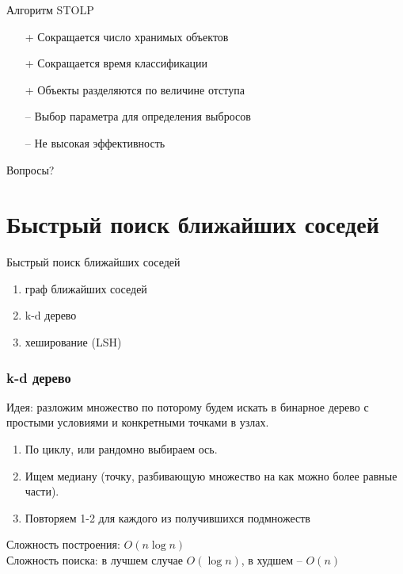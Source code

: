\documentclass[10pt]{beamer}
\begin{document}
\begin{frame}{Алгоритм STOLP}
	\begin{itemize} [<+- | alert@+>]
	\item[+] Сокращается число хранимых объектов
	\item[+] Сокращается время классификации
	\item[+] Объекты разделяются по величине отступа
	\bigbreak
	\item[--] Выбор параметра для определения выбросов
	\item[--] Не высокая эффективность
	\end{itemize}
\end{frame}

\begin{frame}[standout]
  Вопросы?
\end{frame}

\appendix

\section{Быстрый поиск ближайших соседей}

\begin{frame}{Быстрый поиск ближайших соседей}
	\begin{enumerate} [--]
		\item граф ближайших соседей
		\item k-d дерево
		\item хеширование (LSH)
	\end{enumerate}
\end{frame}

\begin{frame}\frametitle{k-d дерево}
	\alert{Идея}: разложим множество по поторому будем искать в бинарное дерево с простыми условиями и конкретными точками в узлах.
	\vspace{5mm}
	\begin{enumerate}
		\item По циклу, или рандомно выбираем ось.
		\item Ищем медиану (точку, разбивающую множество на как можно более равные части).
		\item Повторяем 1-2 для каждого из получившихся подмножеств 
	\end{enumerate}
	Сложность построения: $O(n\log n)$\\
	Сложность поиска: в лучшем случае $O(\log n)$, в худшем -- $O(n)$
\end{frame}
\end{document}

